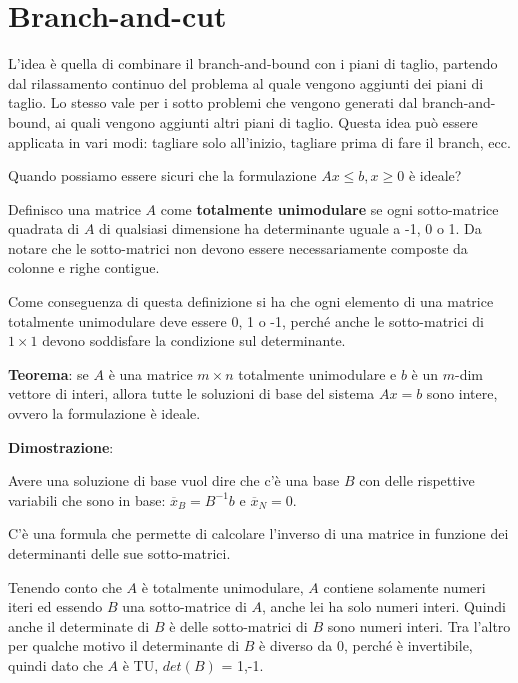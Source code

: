 

\section{Branch-and-cut}

L'idea è quella di combinare il branch-and-bound con i piani di taglio, partendo dal rilassamento continuo del problema al quale vengono aggiunti dei piani di taglio.
Lo stesso vale per i sotto problemi che vengono generati dal branch-and-bound, ai quali vengono aggiunti altri piani di taglio.
Questa idea può essere applicata in vari modi: tagliare solo all'inizio, tagliare prima di fare il branch, ecc.

Quando possiamo essere sicuri che la formulazione $Ax \leq b, x \geq 0$ è ideale?

Definisco una matrice $A$ come \textbf{totalmente unimodulare} se ogni sotto-matrice quadrata di $A$ di qualsiasi dimensione ha determinante uguale a -1, 0 o 1. Da notare che le sotto-matrici non devono essere necessariamente composte da colonne e righe contigue.

Come conseguenza di questa definizione si ha che ogni elemento di una matrice totalmente unimodulare deve essere 0, 1 o -1, perché anche le sotto-matrici di $1\times1$ devono soddisfare la condizione sul determinante.

\textbf{Teorema}: se $A$ è una matrice $m\times n$ totalmente unimodulare e $b$ è un $m$-dim vettore di interi, allora tutte le soluzioni di base del sistema $Ax = b$ sono intere, ovvero la formulazione è ideale.

\textbf{Dimostrazione}:

Avere una soluzione di base vuol dire che c'è una base $B$ con delle rispettive variabili che sono in base: $\overline{x}_B = B^{-1}b$ e $\overline{x}_N = 0$.

C'è una formula che permette di calcolare l'inverso di una matrice in funzione dei determinanti delle sue sotto-matrici.

Tenendo conto che $A$ è totalmente unimodulare, $A$ contiene solamente numeri iteri ed essendo $B$ una sotto-matrice di $A$, anche lei ha solo numeri interi. Quindi anche il determinate di $B$ è delle sotto-matrici di $B$ sono numeri interi. 
Tra l'altro per qualche motivo il determinante di $B$ è diverso da 0, perché è invertibile, quindi dato che $A$ è TU, $det(B)$ = 1,-1.

